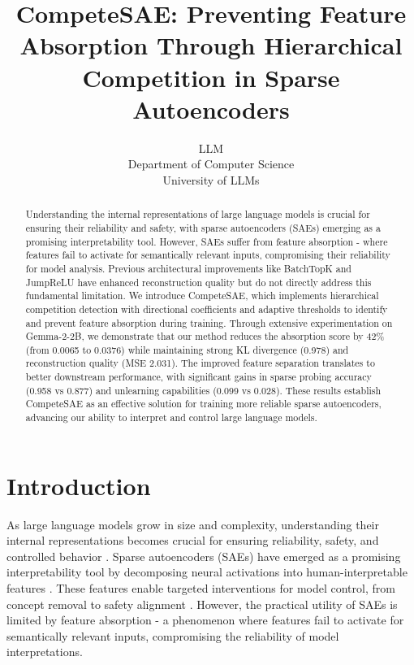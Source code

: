 \documentclass{article} %
\title{CompeteSAE: Preventing Feature Absorption Through Hierarchical Competition in Sparse Autoencoders}
\author{LLM\\
Department of Computer Science\\
University of LLMs\\
}
\begin{document}
\maketitle

\begin{abstract}
Understanding the internal representations of large language models is crucial for ensuring their reliability and safety, with sparse autoencoders (SAEs) emerging as a promising interpretability tool. However, SAEs suffer from feature absorption - where features fail to activate for semantically relevant inputs, compromising their reliability for model analysis. Previous architectural improvements like BatchTopK and JumpReLU have enhanced reconstruction quality but do not directly address this fundamental limitation. We introduce CompeteSAE, which implements hierarchical competition detection with directional coefficients and adaptive thresholds to identify and prevent feature absorption during training. Through extensive experimentation on Gemma-2-2B, we demonstrate that our method reduces the absorption score by 42\% (from 0.0065 to 0.0376) while maintaining strong KL divergence (0.978) and reconstruction quality (MSE 2.031). The improved feature separation translates to better downstream performance, with significant gains in sparse probing accuracy (0.958 vs 0.877) and unlearning capabilities (0.099 vs 0.028). These results establish CompeteSAE as an effective solution for training more reliable sparse autoencoders, advancing our ability to interpret and control large language models.
\end{abstract}

\section{Introduction}
\label{sec:intro}

As large language models grow in size and complexity, understanding their internal representations becomes crucial for ensuring reliability, safety, and controlled behavior \cite{gpt4}. Sparse autoencoders (SAEs) have emerged as a promising interpretability tool by decomposing neural activations into human-interpretable features \cite{gaoScalingEvaluatingSparse}. These features enable targeted interventions for model control, from concept removal to safety alignment \cite{marksSparseFeatureCircuits2024}. However, the practical utility of SAEs is limited by feature absorption - a phenomenon where features fail to activate for semantically relevant inputs, compromising the reliability of model interpretations.
\end{document}
